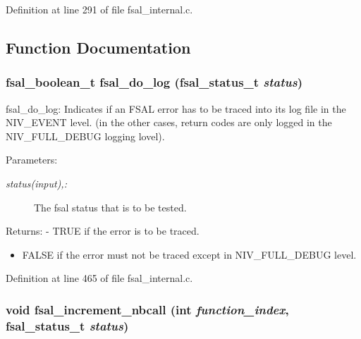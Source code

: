 Definition at line 291 of file fsal\_\-internal.c.

\subsection{Function Documentation}
\subsubsection[{fsal\_\-do\_\-log}]{\setlength{\rightskip}{0pt plus 5cm}fsal\_\-boolean\_\-t fsal\_\-do\_\-log (fsal\_\-status\_\-t {\em status})}\label{fsal__internal_8c_07976458ca604abb5159c050190c53d4}


fsal\_\-do\_\-log: Indicates if an FSAL error has to be traced into its log file in the NIV\_\-EVENT level. (in the other cases, return codes are only logged in the NIV\_\-FULL\_\-DEBUG logging lovel).

\begin{Desc}
\item[Parameters:]
\begin{description}
\item[{\em status(input),:}]The fsal status that is to be tested.\end{description}
\end{Desc}
\begin{Desc}
\item[Returns:]- TRUE if the error is to be traced.\begin{itemize}
\item FALSE if the error must not be traced except in NIV\_\-FULL\_\-DEBUG level. \end{itemize}
\end{Desc}


Definition at line 465 of file fsal\_\-internal.c.
\subsubsection[{fsal\_\-increment\_\-nbcall}]{\setlength{\rightskip}{0pt plus 5cm}void fsal\_\-increment\_\-nbcall (int {\em function\_\-index}, \/  fsal\_\-status\_\-t {\em status})}\label{fsal__internal_8c_79dcb2ba7f283a1ba5c6010d76fa88f1}


